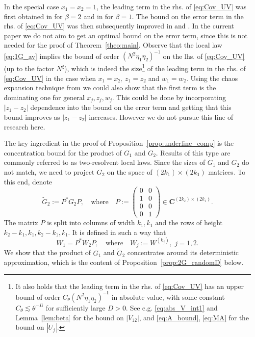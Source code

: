 \documentclass[10pt]{amsart}
\numberwithin{equation}{section}
\newcommand{\C}{\mathbf{C}}
\begin{document}
In the special case $x_1=x_2=1$, the leading term in the rhs. of \eqref{eq:Cov_UV} was first obtained in \cite[Theorem~3.3]{macroCLT_complex} for $\beta=2$ and in \cite[Theorem~3.3]{macroCLT_real} for $\beta=1$. The bound on the error term in the rhs. of \eqref{eq:Cov_UV} was then subsequently improved in \cite[Proposition~3.4]{Cipolloni_meso} and \cite[Proposition~3.4]{hyperuniformity}. In the current paper we do not aim to get an optimal bound on the error term, since this is not needed for the proof of Theorem~\ref{theo:main}. Observe that the local law \eqref{eq:1G_av} implies the bound of order $(N^2\eta_1\eta_2)^{-1}$ on the lhs. of \eqref{eq:Cov_UV} (up to the factor $N^\xi$), which is indeed the size\footnote{It also holds that the leading term in the rhs. of \eqref{eq:Cov_UV} has an upper bound of order $C_\theta(N^2\eta_1\eta_2)^{-1}$ in absolute value, with some constant $C_\theta\lesssim \theta^{-D}$ for sufficiently large $D>0$. See e.g. \eqref{eq:abs_V_int1} and Lemma~\ref{lem:beta} for the bound on $|V_{12}|$, and  \eqref{eq:A_bound}, \eqref{eq:MA} for the bound on $|U_j|$.}  of the leading term in the rhs. of \eqref{eq:Cov_UV} in the case when $x_1=x_2$, $z_1=z_2$ and $w_1=w_2$. Using the chaos expansion technique from \cite[Section~7]{hyperuniformity} we could also show that the first term is the dominating one for general $x_j,z_j,w_j$. This could be done by incorporating $|z_1-z_2|$ dependence into the bound on the error term and getting that this bound improves as $|z_1-z_2|$ increases. However we do not pursue this line of research here.

The key ingredient in the proof of Proposition~\ref{prop:underline_comp} is the concentration bound for the product of $G_1$ and $G_2$. Results of this type are commonly referred to as two-resolvent local laws. Since the sizes of $G_1$ and $G_2$ do not match, we need to project $G_2$ on the space of $(2k_1)\times (2k_1)$ matrices. To this end, denote
\begin{equation}
\label{eq:defP}
\widetilde{G}_2:=P^*G_2P,\quad\text{where}\quad P:=\begin{pmatrix}
0&0\\1&0\\0&0\\0&1
\end{pmatrix}\in \C^{(2k_2)\times (2k_1)}.
\end{equation}
The matrix $P$ is split into columns of width $k_1,k_1$ and the rows of height $k_2-k_1, k_1,k_2-k_1,k_1$. It is defined in such a way that
\begin{equation}
W_1=P^*W_2P,\quad \text{where}\quad W_j:=W^{(k_j)},\,\,j=1,2. 
\end{equation}
We show that the product of $G_1$ and $\widetilde{G}_2$ concentrates around its deterministic approximation, which is the content of Proposition~\ref{prop:2G_randomD} below.
\end{document}
